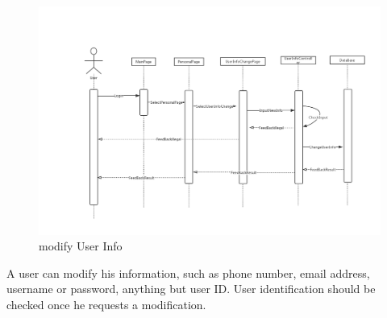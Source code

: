 \documentclass[16pt]{scrreprt}
\begin{document}
\begin{figure}[H]
    \includegraphics[width=\linewidth]{./FuncPhoto/4.png}   
    \caption{modify User Info}
\end{figure}
A user can modify his information, such as phone number, email address, username or password, anything but user ID. User identification should be checked once he requests a modification.
\end{document}

